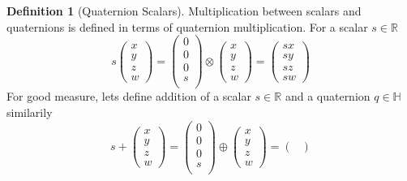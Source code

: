 \documentclass{amsart}
\theoremstyle{definition}
\newtheorem{definition}[theorem]{Definition}
\theoremstyle{remark}
\numberwithin{equation}{section}
\begin{document}
\begin{definition}[Quaternion Scalars]
  Multiplication between scalars and quaternions is defined in terms of quaternion multiplication. For a scalar $s\in\mathbb{R}$
  \begin{equation}
    s
    \begin{pmatrix}
      x \\
      y \\
      z \\
      w
    \end{pmatrix} =
    \begin{pmatrix}
      0 \\
      0 \\
      0 \\
      s \\
    \end{pmatrix}
    \otimes 
    \begin{pmatrix}
      x \\
      y \\
      z \\
      w
    \end{pmatrix} = 
    \begin{pmatrix}
      sx \\
      sy \\
      sz \\
      sw
    \end{pmatrix}
  \end{equation}
  For good measure, lets define addition of a scalar $s\in\mathbb{R}$ and a quaternion $q\in\mathbb{H}$ similarily
  \begin{equation}
    s+
    \begin{pmatrix}
      x \\
      y \\
      z \\
      w
    \end{pmatrix} =
    \begin{pmatrix}
      0 \\
      0 \\
      0 \\
      s \\
    \end{pmatrix}
    \oplus
    \begin{pmatrix}
      x \\
      y \\
      z \\
      w
    \end{pmatrix} = 
    \begin{pmatrix}

\end{pmatrix}
\end{equation}
\end{definition}
\end{document}
